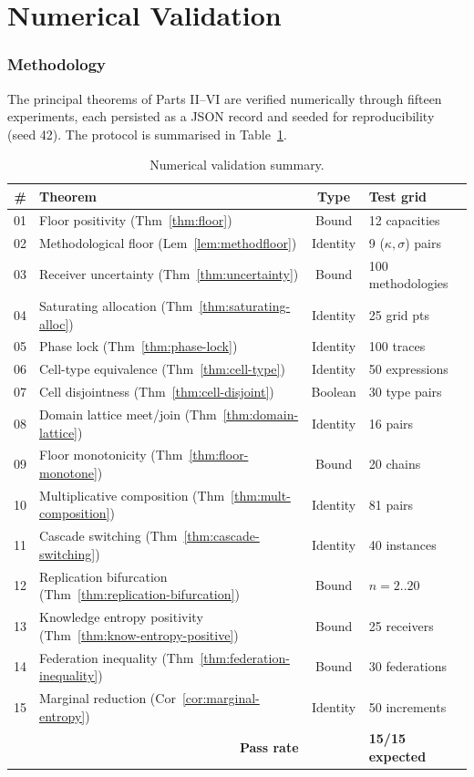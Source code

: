 \documentclass[11pt,a4paper]{article}
\newcommand{\catpow}{\kappa}
\newcommand{\disp}{\sigma}
\begin{document}
\part{Numerical Validation}

\section{Methodology}
\label{sec:val-methodology}

The principal theorems of Parts II--VI are verified numerically through fifteen experiments, each persisted as a JSON record and seeded for reproducibility (seed 42). The protocol is summarised in Table~\ref{tab:val-summary}.

\begin{table}[!htbp]
\centering
\small
\caption{Numerical validation summary.}
\label{tab:val-summary}
\begin{tabular}{rlcl}
\toprule
\# & Theorem & Type & Test grid \\
\midrule
01 & Floor positivity (Thm~\ref{thm:floor}) & Bound & 12 capacities \\
02 & Methodological floor (Lem~\ref{lem:methodfloor}) & Identity & 9 ($\catpow,\disp$) pairs \\
03 & Receiver uncertainty (Thm~\ref{thm:uncertainty}) & Bound & 100 methodologies \\
04 & Saturating allocation (Thm~\ref{thm:saturating-alloc}) & Identity & 25 grid pts \\
05 & Phase lock (Thm~\ref{thm:phase-lock}) & Identity & 100 traces \\
06 & Cell-type equivalence (Thm~\ref{thm:cell-type}) & Identity & 50 expressions \\
07 & Cell disjointness (Thm~\ref{thm:cell-disjoint}) & Boolean & 30 type pairs \\
08 & Domain lattice meet/join (Thm~\ref{thm:domain-lattice}) & Identity & 16 pairs \\
09 & Floor monotonicity (Thm~\ref{thm:floor-monotone}) & Bound & 20 chains \\
10 & Multiplicative composition (Thm~\ref{thm:mult-composition}) & Identity & 81 pairs \\
11 & Cascade switching (Thm~\ref{thm:cascade-switching}) & Identity & 40 instances \\
12 & Replication bifurcation (Thm~\ref{thm:replication-bifurcation}) & Bound & $n=2..20$ \\
13 & Knowledge entropy positivity (Thm~\ref{thm:know-entropy-positive}) & Bound & 25 receivers \\
14 & Federation inequality (Thm~\ref{thm:federation-inequality}) & Bound & 30 federations \\
15 & Marginal reduction (Cor~\ref{cor:marginal-entropy}) & Identity & 50 increments \\
\midrule
\multicolumn{2}{r}{\textbf{Pass rate}} & & \textbf{15/15 expected} \\
\bottomrule
\end{tabular}
\end{table}
\end{document}
